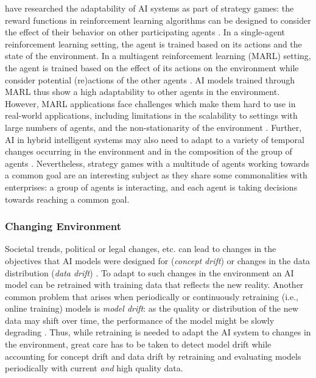 \cite{madeiraDesigningReinforcementLearningBased2006} have researched the adaptability of AI 
systems as part of strategy games: the reward functions in reinforcement learning algorithms can be designed to consider
the effect of their behavior on other participating agents \citep{madeiraDesigningReinforcementLearningBased2006}.
In a single-agent reinforcement learning setting, the agent is trained based on its actions and the state of the
environment. In a multiagent reinforcement learning (MARL) setting, the agent is trained based on the effect of its
actions on the environment while consider potential (re)actions of the other agents \citep{caneseMultiAgentReinforcementLearning2021}.
AI models trained through MARL thus show a high adaptability to other agents in the environment. However, MARL applications
face challenges which make them hard to use in real-world applications, including limitations in the scalability to settings
with large numbers of agents, and the non-stationarity of the environment \citep{caneseMultiAgentReinforcementLearning2021}. 
Further, AI in hybrid intelligent systems may also need to adapt to a variety of temporal changes occurring in the environment
and in the composition of the group of agents \citep{akataResearchAgendaHybrid2020}. Nevertheless, strategy games with a
multitude of agents working towards a common goal are an interesting subject as they share some commonalities with enterprises:
a group of agents is interacting, and each agent is taking decisions towards reaching a common goal.


\subsubsection{Changing Environment}

Societal trends, political or legal changes, etc. can lead to changes in the objectives that AI models were designed for
(\textit{concept drift}) or changes in the data distribution (\textit{data drift}) \citep{luDatadrivenDecisionSupport2020}.
To adapt to such changes in the environment an AI model can be retrained with training data that reflects the new reality.
Another common problem that arises when periodically or continuously retraining (i.e., online training) models is \textit{model drift}:
as the quality or distribution of the new data may shift over time, the performance of the model might be slowly degrading
\citep{nelsonEvaluatingModelDrift2015}. Thus, while retraining is needed to adapt the AI system to changes in the environment,
great care has to be taken to detect model drift while accounting for concept drift and data drift by retraining and evaluating
models periodically with current \textit{and} high quality data.


